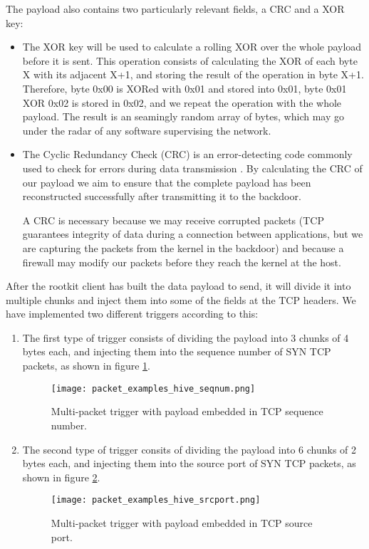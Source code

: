 The payload also contains two particularly relevant fields, a CRC and a XOR key:
\begin{itemize}
\item The XOR key will be used to calculate a rolling XOR over the whole payload before it is sent. This operation consists of calculating the XOR of each byte X with its adjacent X+1, and storing the result of the operation in byte X+1. Therefore, byte 0x00 is XORed with 0x01 and stored into 0x01, byte 0x01 XOR 0x02 is stored in 0x02, and we repeat the operation with the whole payload. The result is an seamingly random array of bytes, which may go under the radar of any software supervising the network.
\item The Cyclic Redundancy Check (CRC) is an error-detecting code commonly used to check for errors during data transmission \cite{crc}. By calculating the CRC of our payload we aim to ensure that the complete payload has been reconstructed successfully after transmitting it to the backdoor.

A CRC is necessary because we may receive corrupted packets (TCP guarantees integrity of data during a connection between applications, but we are capturing the packets from the kernel in the backdoor) and because a firewall may modify our packets before they reach the kernel at the host.
\end{itemize}

After the rootkit client has built the data payload to send, it will divide it into multiple chunks and inject them into some of the fields at the TCP headers. We have implemented two different triggers according to this:
\begin{enumerate}
\item The first type of trigger consists of dividing the payload into 3 chunks of 4 bytes each, and injecting them into the sequence number of SYN TCP packets, as shown in figure \ref{fig:hive_seqnum}.

\begin{figure}[htbp]
	\centering
	\texttt{[image: packet\_examples\_hive\_seqnum.png]}
	\caption{Multi-packet trigger with payload embedded in TCP sequence number.}
	\label{fig:hive_seqnum}
\end{figure}

\item The second type of trigger consits of dividing the payload into 6 chunks of 2 bytes each, and injecting them into the source port of SYN TCP packets, as shown in figure \ref{fig:hive_srcport}.

\begin{figure}[htbp]
	\centering
	\texttt{[image: packet\_examples\_hive\_srcport.png]}
	\caption{Multi-packet trigger with payload embedded in TCP source port.}
	\label{fig:hive_srcport}
\end{figure}

\end{enumerate}

